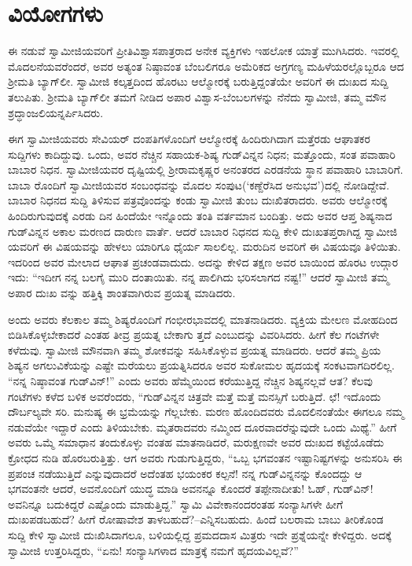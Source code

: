 
\chapter{ವಿಯೋಗಗಳು}

\noindent

ಈ ನಡುವೆ ಸ್ವಾಮೀಜಿಯವರಿಗೆ ಪ್ರೀತಿವಿಶ್ವಾಸಪಾತ್ರರಾದ ಅನೇಕ ವ್ಯಕ್ತಿಗಳು ಇಹಲೋಕ ಯಾತ್ರೆ ಮುಗಿಸಿದರು. ಇವರಲ್ಲಿ ಮೊದಲನೆಯವರೆಂದರೆ, ಅವರ ಅತ್ಯಂತ ನಿಷ್ಠಾವಂತ ಬೆಂಬಲಿಗರೂ ಅಮೆರಿಕದ ಅಗ್ರಗಣ್ಯ ಮಹಿಳೆಯರಲ್ಲೊಬ್ಬರೂ ಆದ ಶ್ರೀಮತಿ ಬ್ಯಾಗ್​ಲೀ. ಸ್ವಾಮೀಜಿ ಕಲ್ಕತ್ತದಿಂದ ಹೊರಟು ಆಲ್ಮೋರಕ್ಕೆ ಬರುತ್ತಿದ್ದಂತೆಯೇ ಅವರಿಗೆ ಈ ದುಃಖದ ಸುದ್ದಿ ತಲುಪಿತು. ಶ್ರೀಮತಿ ಬ್ಯಾಗ್​ಲೀ ತಮಗೆ ನೀಡಿದ ಅಪಾರ ವಿಶ್ವಾಸ-ಬೆಂಬಲಗಳನ್ನು ನೆನೆದು ಸ್ವಾಮೀಜಿ, ತಮ್ಮ ಮೌನ ಶ್ರದ್ಧಾಂಜಲಿಯನ್ನರ್ಪಿಸಿದರು.

ಈಗ ಸ್ವಾಮೀಜಿಯವರು ಸೇವಿಯರ್ ದಂಪತಿಗಳೊಂದಿಗೆ ಆಲ್ಮೋರಕ್ಕೆ ಹಿಂದಿರುಗಿದಾಗ ಮತ್ತೆರಡು ಆಘಾತಕರ ಸುದ್ದಿಗಳು ಕಾದಿದ್ದುವು. ಒಂದು, ಅವರ ನೆಚ್ಚಿನ ಸಹಾಯಕ-ಶಿಷ್ಯ ಗುಡ್​ವಿನ್ನನ ನಿಧನ; ಮತ್ತೊಂದು, ಸಂತ ಪವಾಹಾರಿ ಬಾಬಾರ ನಿಧನ. ಸ್ವಾಮೀಜಿಯವರ ದೃಷ್ಟಿಯಲ್ಲಿ ಶ್ರೀರಾಮಕೃಷ್ಣರ ಅನಂತರದ ಎರಡನೆಯ ಸ್ಥಾನ ಪವಾಹಾರಿ ಬಾಬಾರಿಗೆ. ಬಾಬಾ ರೊಂದಿಗೆ ಸ್ವಾಮೀಜಿಯವರ ಸಂಬಂಧವನ್ನು ಮೊದಲ ಸಂಪುಟ(‘ಕಣ್ದೆರೆಸಿದ ಅನುಭವ’)ದಲ್ಲಿ ನೋಡಿದ್ದೇವೆ. ಬಾಬಾರ ನಿಧನದ ಸುದ್ದಿ ತಿಳಿಸುವ ಪತ್ರವೊಂದನ್ನು ಕಂಡು ಸ್ವಾಮೀಜಿ ತುಂಬ ದುಃಖಿತರಾದರು. ಅವರು ಆಲ್ಮೋರಕ್ಕೆ ಹಿಂದಿರುಗುವುದಕ್ಕೆ ಎರಡು ದಿನ ಹಿಂದೆಯೇ ಇನ್ನೊಂದು ತಂತಿ ವರ್ತಮಾನ ಬಂದಿತ್ತು. ಅದು ಅವರ ಆಪ್ತ ಶಿಷ್ಯನಾದ ಗುಡ್​ವಿನ್ನನ ಅಕಾಲ ಮರಣದ ದಾರುಣ ವಾರ್ತೆ. ಆದರೆ ಬಾಬಾರ ನಿಧನದ ಸುದ್ದಿ ಕೇಳಿ ದುಃಖತಪ್ತರಾಗಿದ್ದ ಸ್ವಾಮೀಜಿ ಯವರಿಗೆ ಈ ವಿಷಯವನ್ನು ಹೇಳಲು ಯಾರಿಗೂ ಧೈರ್ಯ ಸಾಲಲಿಲ್ಲ. ಮರುದಿನ ಅವರಿಗೆ ಈ ವಿಷಯವೂ ತಿಳಿಯಿತು. ಇದರಿಂದ ಅವರ ಮೇಲಾದ ಆಘಾತ ಪ್ರಚಂಡವಾದುದು. ಅದನ್ನು ಕೇಳಿದ ತಕ್ಷಣ ಅವರ ಬಾಯಿಂದ ಹೊರಟ ಉದ್ಗಾರ ಇದು: “ಇದೀಗ ನನ್ನ ಬಲಗೈ ಮುರಿ ದಂತಾಯಿತು. ನನ್ನ ಪಾಲಿಗಿದು ಭರಿಸಲಾಗದ ನಷ್ಟ!” ಆದರೆ ಸ್ವಾಮೀಜಿ ತಮ್ಮ ಅಪಾರ ದುಃಖ ವನ್ನು ಹತ್ತಿಕ್ಕಿ ಶಾಂತವಾಗಿರುವ ಪ್ರಯತ್ನ ಮಾಡಿದರು.

ಅಂದು ಅವರು ಕೆಲಕಾಲ ತಮ್ಮ ಶಿಷ್ಯರೊಂದಿಗೆ ಗಂಭೀರಭಾವದಲ್ಲಿ ಮಾತನಾಡಿದರು. ವ್ಯಕ್ತಿಯ ಮೇಲಣ ಮೋಹದಿಂದ ಬಿಡಿಸಿಕೊಳ್ಳಬೇಕಾದರೆ ಎಂತಹ ತೀವ್ರ ಪ್ರಯತ್ನ ಬೇಕಾಗು ತ್ತದೆ ಎಂಬುದನ್ನು ವಿವರಿಸಿದರು. ಹೀಗೆ ಕೆಲ ಗಂಟೆಗಳೇ ಕಳೆದುವು. ಸ್ವಾಮೀಜಿ ಮೌನವಾಗಿ ತಮ್ಮ ಶೋಕವನ್ನು ಸಹಿಸಿಕೊಳ್ಳುವ ಪ್ರಯತ್ನ ಮಾಡಿದರು. ಆದರೆ ತಮ್ಮ ಪ್ರಿಯ ಶಿಷ್ಯನ ಅಗಲುವಿಕೆಯನ್ನು ಎಷ್ಟೇ ಮರೆಯಲು ಪ್ರಯತ್ನಿಸಿದರೂ ಅವರ ಸುಕೋಮಲ ಹೃದಯಕ್ಕೆ ಸಂಕಟವಾಗದಿರಲಿಲ್ಲ. “ನನ್ನ ನಿಷ್ಠಾವಂತ ಗುಡ್​ವಿನ್!” ಎಂದು ಅವರು ಹೆಮ್ಮೆಯಿಂದ ಕರೆಯುತ್ತಿದ್ದ ನೆಚ್ಚಿನ ಶಿಷ್ಯನಲ್ಲವೆ ಆತ? ಕೆಲವು ಗಂಟೆಗಳು ಕಳೆದ ಬಳಿಕ ಅವರೆಂದರು, “ಗುಡ್​ವಿನ್ನನ ಚಿತ್ರವೇ ಮತ್ತೆ ಮತ್ತೆ ಮನಸ್ಸಿಗೆ ಬರುತ್ತಿದೆ. ಛೆ! ಇದೊಂದು ದೌರ್ಬಲ್ಯವೇ ಸರಿ. ಮನುಷ್ಯ ಈ ಭ್ರಮೆಯನ್ನು ಗೆಲ್ಲಬೇಕು. ಮರಣ ಹೊಂದಿದವರು ಮೊದಲಿನಂತೆಯೇ ಈಗಲೂ ನಮ್ಮ ನಡುವೆಯೇ ಇದ್ದಾರೆ ಎಂದು ತಿಳಿಯಬೇಕು. ಮೃತರಾದವರು ನಮ್ಮಿಂದ ದೂರವಾದರೆನ್ನುವುದೇ ಒಂದು ಮಿಥ್ಯೆ.” ಹೀಗೆ ಅವರು ಒಮ್ಮೆ ಸಮಾಧಾನ ತಂದುಕೊಳ್ಳು ವಂತಹ ಮಾತನಾಡಿದರೆ, ಮರುಕ್ಷಣವೇ ಅವರ ದುಃಖದ ಕಟ್ಟೆಯೊಡೆದು ಕ್ರೋಧದ ನುಡಿ ಹೊರಬರುತ್ತಿತ್ತು. ಆಗ ಅವರು ಗುಡುಗುತ್ತಿದ್ದರು, “ಒಬ್ಬ ಭಗವಂತನ ಇಷ್ಟಾನಿಷ್ಟಗಳನ್ನು ಅನುಸರಿಸಿ ಈ ಪ್ರಪಂಚ ನಡೆಯುತ್ತಿದೆ ಎನ್ನುವುದಾದರೆ ಅದೆಂತಹ ಭಯಂಕರ ಕಲ್ಪನೆ! ನನ್ನ ಗುಡ್​ವಿನ್ನನನ್ನು ಕೊಂದದ್ದು ಆ ಭಗವಂತನೇ ಆದರೆ, ಅವನೊಂದಿಗೆ ಯುದ್ಧ ಮಾಡಿ ಅವನನ್ನೂ ಕೊಂದರೆ ತಪ್ಪೇನಾದೀತು! ಓಹ್, ಗುಡ್​ವಿನ್! ಅವನಿನ್ನೂ ಬದುಕಿದ್ದರೆ ಎಷ್ಟೊಂದು ಮಾಡುತ್ತಿದ್ದ.” ಸ್ವಾಮಿ ವಿವೇಕಾನಂದರಂತಹ ಸಂನ್ಯಾಸಿಗಳೇ ಹೀಗೆ ದುಃಖಪಡಬಹುದೆ? ಹೀಗೆ ರೋಷಾವೇಶ ತಾಳಬಹುದೆ?–ಎನ್ನಿಸಬಹುದು. ಹಿಂದೆ ಬಲರಾಮ ಬಾಬು ತೀರಿಕೊಂಡ ಸುದ್ದಿ ಕೇಳಿ ಸ್ವಾಮೀಜಿ ದುಃಖಿಸಿದಾಗಲೂ, ಬಳಿಯಲ್ಲಿದ್ದ ಪ್ರಮದದಾಸ ಮಿತ್ರರು ಇದೇ ಪ್ರಶ್ನೆಯನ್ನೇ ಕೇಳಿದ್ದರು. ಅದಕ್ಕೆ ಸ್ವಾಮೀಜಿ ಉತ್ತರಿಸಿದ್ದರು, “ಏನು! ಸಂನ್ಯಾಸಿಗಳಾದ ಮಾತ್ರಕ್ಕೆ ನಮಗೆ ಹೃದಯವಿಲ್ಲವೆ?”

